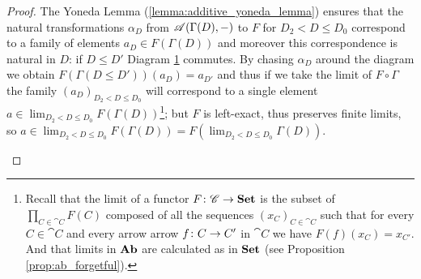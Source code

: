 \begin{proof}
  The Yoneda Lemma (\ref{lemma:additive_yoneda_lemma}) ensures that the natural transformations \(\alpha_D\) from \({\mathscr A}(\Gamma(D),-)\) to \(F\) for \(D_2<D\leq D_0\) correspond to a family of elements \(a_D\in F(\Gamma(D))\) and moreover this correspondence is natural in \(D\): if \(D\leq D'\) Diagram \ref{diagram:y1} commutes. By chasing \(\alpha_D\) around the diagram we obtain \(F(\Gamma(D\leq D'))(a_D) = a_{D'}\)  and thus if we take the limit of \(F\circ\Gamma\) the family \((a_D)_{D_2<D\leq D_0}\) will correspond to a single element \(a\in\lim_{D_2<D\leq D_0}F(\Gamma(D))\)\footnote{Recall that the limit of a functor \(F\colon {\mathscr C}\to \text{\normalfont\textbf{Set}}\) is the subset of \(\prod_{C\in\cat{C}}F(C)\) composed of all the sequences \((x_C)_{C\in\cat{C}}\) such that for every \(C\in\cat{C}\) and every arrow arrow \(f\colon C\to C'\) in \(\cat{C}\) we have \(F(f)(x_C)=x_{C'}\). And that limits in \(\text{\normalfont\textbf{Ab}}\) are calculated as in \(\text{\normalfont\textbf{Set}}\) (see Proposition \ref{prop:ab_forgetful}).}; but \(F\) is left-exact, thus preserves finite limits, so \(a\in\lim_{D_2<D\leq D_0}F(\Gamma(D)) = F(\lim_{D_2<D\leq D_0}\Gamma(D))\).
  \begin{figure}[h]
    \begin{center}
    \end{center}
    \caption{}
    \label{diagram:y1}
  \end{figure}


\end{proof}
